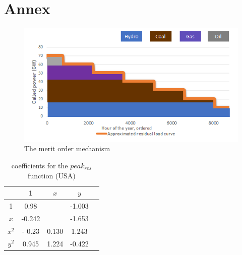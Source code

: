 \newpage
\section{Annex}

\begin{figure}[H]
    \centering
    \includegraphics{figures&tables/dispatch.png}
    \caption{The merit order mechanism}
    \label{fig:dispatch}
\end{figure}

    \begin{table}[H]
        \centering
        \begin{tabular}{|c||c|c|c|c|}
            \hline
                  & 1   & $x$ & $y$ \\
                  \hline
                  \hline
            1     &0.98&      & -1.003\\
            \hline
            $x$   & -0.242  &       & -1.653 \\
                  \hline
            $x^2$ & - 0.23    &  0.130     & 1.243 \\
            \hline
            $y^2$ &  0.945   &   1.224    &-0.422 \\
                  \hline
                  \hline
        \end{tabular}
        \caption{ coefficients for the $peak_{res}$ function (USA)}
    \end{table}
